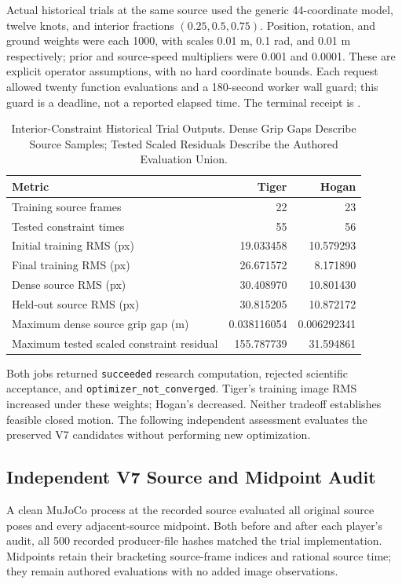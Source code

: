 \documentclass[11pt,letterpaper]{article}
\newcommand{\code}[1]{\nolinkurl{#1}}
\begin{document}
Actual historical trials at the same source used the generic 44-coordinate
model, twelve knots, and interior fractions $(0.25,0.5,0.75)$. Position,
rotation, and ground weights were each 1000, with scales 0.01 m, 0.1 rad,
and 0.01 m respectively; prior and source-speed multipliers were 0.001 and
0.0001. These are explicit operator assumptions, with no hard coordinate
bounds. Each request allowed twenty function evaluations and a 180-second
worker wall guard; this guard is a deadline, not a reported elapsed time.
The terminal receipt is
.

\begin{table}[ht]
\centering\small
\begin{tabular}{@{}lrr@{}}
\toprule Metric & Tiger & Hogan\\\midrule
Training source frames & 22 & 23\\
Tested constraint times & 55 & 56\\
Initial training RMS (px) & 19.033458 & 10.579293\\
Final training RMS (px) & 26.671572 & 8.171890\\
Dense source RMS (px) & 30.408970 & 10.801430\\
Held-out source RMS (px) & 30.815205 & 10.872172\\
Maximum dense source grip gap (m) & 0.038116054 & 0.006292341\\
Maximum tested scaled constraint residual & 155.787739 & 31.594861\\
\bottomrule
\end{tabular}
\caption{Interior-Constraint Historical Trial Outputs. Dense Grip Gaps Describe
Source Samples; Tested Scaled Residuals Describe the Authored Evaluation Union.}
\end{table}

Both jobs returned \code{succeeded} research computation, rejected scientific
acceptance, and \code{optimizer_not_converged}. Tiger's training image RMS
increased under these weights; Hogan's decreased. Neither tradeoff establishes
feasible closed motion. The following independent assessment evaluates the
preserved V7 candidates without performing new optimization.

\subsection{Independent V7 Source and Midpoint Audit}
A clean MuJoCo process at the recorded source evaluated all original source
poses and every adjacent-source midpoint. Both before and after each player's
audit, all 500 recorded producer-file hashes matched the trial implementation.
Midpoints retain their bracketing source-frame indices and rational source
time; they remain authored evaluations with no added image observations.
\end{document}
